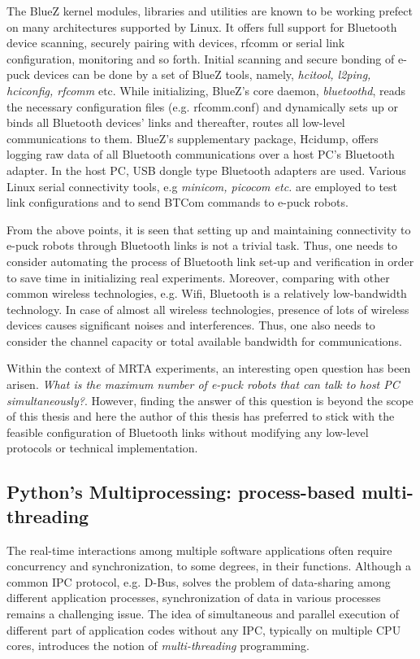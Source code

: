 The BlueZ kernel modules, libraries and utilities are known to be working prefect on many architectures supported by Linux. It offers full support for Bluetooth device scanning, securely pairing with devices,  rfcomm or serial link configuration, monitoring and so forth. Initial  scanning and secure bonding of e-puck devices can be done by a set of BlueZ tools, namely, {\em hcitool, l2ping, hciconfig, rfcomm} etc. While initializing, BlueZ's  core daemon, {\em bluetoothd}, reads the necessary configuration files (e.g. rfcomm.conf) and dynamically sets up or binds all Bluetooth devices' links and thereafter, routes all low-level communications to them. BlueZ's supplementary package, Hcidump, offers logging raw data of all Bluetooth communications over a host PC's Bluetooth adapter.  In the host PC,  USB dongle type  Bluetooth adapters are used. Various Linux serial connectivity tools, e.g {\em minicom, picocom etc.} are employed to test link configurations and to send BTCom commands to e-puck robots.

From the above points, it is seen that setting up and maintaining connectivity to e-puck robots through Bluetooth links is  not a trivial task. Thus, one needs to consider automating the process of Bluetooth link set-up and verification in order to save time in initializing real experiments. Moreover, comparing with other common wireless technologies, e.g. Wifi, Bluetooth is a relatively low-bandwidth technology. In case of almost all wireless technologies, presence of lots of wireless devices  causes significant noises and interferences. Thus, one also needs to consider the channel capacity or total available bandwidth for communications. 

Within the context of MRTA experiments, an interesting open question has been arisen. {\em What is the maximum number of e-puck robots that can talk to host PC simultaneously?}. However, finding the answer of this question is beyond the scope of this thesis and here the author of this thesis  has preferred to stick with the feasible configuration of Bluetooth links without modifying any low-level protocols or technical implementation.
\subsection{Python's Multiprocessing: process-based multi-threading}
\label{expt-tools:python}
The real-time interactions among multiple software applications often require concurrency and synchronization, to some degrees, in their functions. Although a common IPC protocol, e.g. D-Bus, solves the problem of data-sharing among different application processes, synchronization of data in various processes remains a challenging issue.   The idea of simultaneous and parallel execution of different part of application codes without any IPC, typically on  multiple CPU cores, introduces the notion of {\em multi-threading} programming. 

